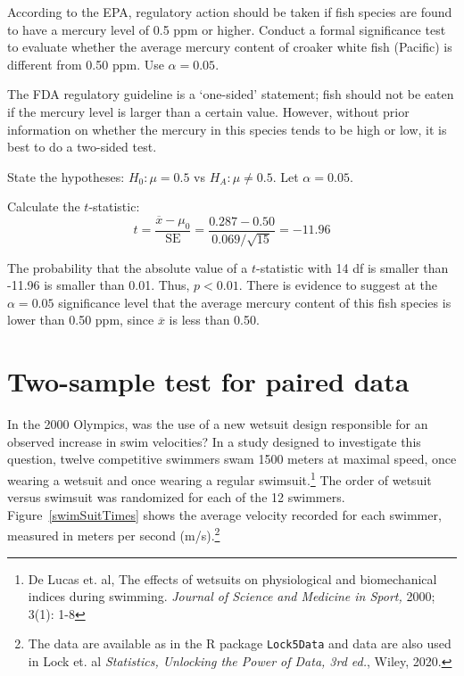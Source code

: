\begin{examplewrap}
\begin{nexample}{According to the EPA, regulatory action should be taken if fish species are found to have a mercury level of 0.5 ppm or higher. Conduct a formal significance test to evaluate whether the average mercury content of croaker white fish (Pacific) is different from 0.50 ppm. Use $\alpha = 0.05$.}

The FDA regulatory guideline is a `one-sided' statement; fish should not be eaten if the mercury level is larger than a certain value. However, without prior information on whether the mercury in this species tends to be high or low, it is best to do a two-sided test.

State the hypotheses: $H_0: \mu = 0.5$ vs $H_A: \mu \neq 0.5$. Let $\alpha = 0.05$.

Calculate the $t$-statistic: 
\[t = \frac{\overline{x} - \mu_0}{\text{SE}} = \frac{0.287 - 0.50}{0.069/\sqrt{15}} = -11.96\]

The probability that the absolute value of a $t$-statistic with 14 df is smaller than -11.96 is smaller than 0.01. Thus, $p < 0.01$. There is evidence to suggest at the $\alpha = 0.05$ significance level that the average mercury content of this fish species is lower than 0.50 ppm, since $\overline{x}$ is less than 0.50.
\end{nexample}
\end{examplewrap}	




\section{Two-sample test for paired data}
\label{pairedData}


In the 2000 Olympics, was the use of a new wetsuit design responsible for an observed increase in swim velocities? In a study designed to investigate this question, twelve competitive swimmers swam 1500 meters at maximal speed, once wearing a wetsuit and once wearing a regular swimsuit.\footnote{De Lucas et. al, The effects of wetsuits on physiological and biomechanical indices during swimming. \textit{Journal of Science and Medicine in Sport,} 2000; 3(1): 1-8} The order of wetsuit versus swimsuit was randomized for each of the 12 swimmers. Figure~\ref{swimSuitTimes} shows the average velocity recorded for each swimmer, measured in meters per second (m/s).\footnote{The data are available as  in the \textsf{R} package \texttt{Lock5Data} and data are also used in Lock et. al \textit{Statistics, Unlocking the Power of Data, 3rd ed.}, Wiley, 2020.}

